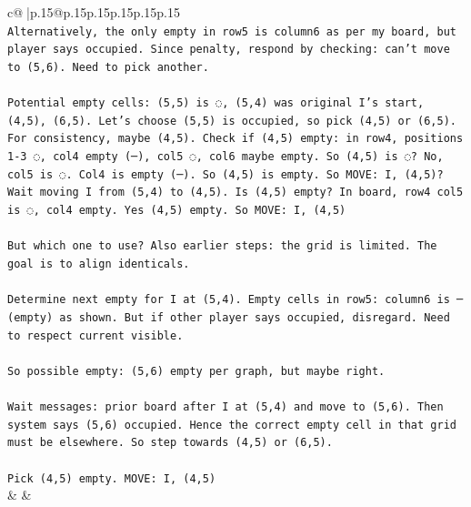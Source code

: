 \documentclass{article}
\begin{document}
{\begin{supertabular}{c@{$\;$}|p{.15\linewidth}@{}p{.15\linewidth}p{.15\linewidth}p{.15\linewidth}p{.15\linewidth}p{.15\linewidth}}
{{{\\ 
\texttt{Alternatively, the only empty in row5 is column6 as per my board, but player says occupied. Since penalty, respond by checking: can't move to (5,6). Need to pick another.} \\
\\ 
\texttt{Potential empty cells: (5,5) is ◌, (5,4) was original I's start, (4,5), (6,5). Let's choose (5,5) is occupied, so pick (4,5) or (6,5). For consistency, maybe (4,5). Check if (4,5) empty: in row4, positions 1{-}3 ◌, col4 empty (─), col5 ◌, col6 maybe empty. So (4,5) is ◌? No, col5 is ◌. Col4 is empty (─). So (4,5) is empty. So MOVE: I, (4,5)? Wait moving I from (5,4) to (4,5). Is (4,5) empty? In board, row4 col5 is ◌, col4 empty. Yes (4,5) empty. So MOVE: I, (4,5)} \\
\\ 
\texttt{But which one to use? Also earlier steps: the grid is limited. The goal is to align identicals.} \\
\\ 
\texttt{Determine next empty for I at (5,4). Empty cells in row5: column6 is ─ (empty) as shown. But if other player says occupied, disregard. Need to respect current visible.} \\
\\ 
\texttt{So possible empty: (5,6) empty per graph, but maybe right.} \\
\\ 
\texttt{Wait messages: prior board after I at (5,4) and move to (5,6). Then system says (5,6) occupied. Hence the correct empty cell in that grid must be elsewhere. So step towards (4,5) or (6,5).} \\
\\ 
\texttt{Pick (4,5) empty. MOVE: I, (4,5)} \\
            }
        }
    }
    & & \\ \\


\end{supertabular}}
\end{document}
